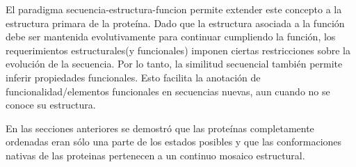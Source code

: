 
El paradigma secuencia-estructura-funcion permite extender este concepto a la estructura primara de la proteína.
Dado que la estructura asociada a la función debe ser mantenida evolutivamente para continuar cumpliendo la función, los requerimientos estructurales(y funcionales) imponen ciertas restricciones sobre la evolución de la secuencia.
Por lo tanto, la similitud secuencial también permite inferir propiedades funcionales. Esto facilita la anotación de funcionalidad/elementos funcionales en secuencias nuevas, aun cuando no se conoce su estructura.





En las secciones anteriores se demostró que las proteínas completamente ordenadas eran sólo una parte de los estados posibles y que las conformaciones nativas de las proteinas pertenecen a un continuo mosaico estructural.






